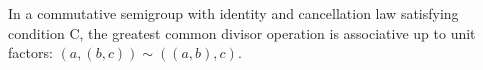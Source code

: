 In a commutative semigroup with identity and cancellation law satisfying condition C, the greatest common divisor operation is associative up to unit factors: $(a, (b, c)) \sim ((a, b), c)$.
